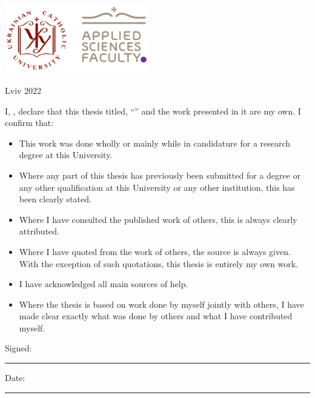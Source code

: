\documentclass[
11pt, %
english, %
singlespacing, %
headsepline, %
openany
]{MastersDoctoralThesis} %
\begin{document}
\begin{titlepage}
\begin{center}
		\vfill
		\includegraphics[height=3cm]{UCU-Apps 2022.png} %

		\vfill
		{\large Lviv 2022}\\[4cm] %

		\vfill
	\end{center}
\end{titlepage}


\begin{declaration}
	\addchaptertocentry{\authorshipname} %
	\noindent I, \authorname, declare that this thesis titled, \enquote{\ttitle} and the work presented in it are my own. I confirm that:

	\begin{itemize}
		\item This work was done wholly or mainly while in candidature for a research degree at this University.
		\item Where any part of this thesis has previously been submitted for a degree or any other qualification at this University or any other institution, this has been clearly stated.
		\item Where I have consulted the published work of others, this is always clearly attributed.
		\item Where I have quoted from the work of others, the source is always given. With the exception of such quotations, this thesis is entirely my own work.
		\item I have acknowledged all main sources of help.
		\item Where the thesis is based on work done by myself jointly with others, I have made clear exactly what was done by others and what I have contributed myself.\\
	\end{itemize}

	\noindent Signed:\\
	\rule[0.5em]{25em}{0.5pt} %

	\noindent Date:\\
	\rule[0.5em]{25em}{0.5pt} %
\end{declaration}
\end{document}

